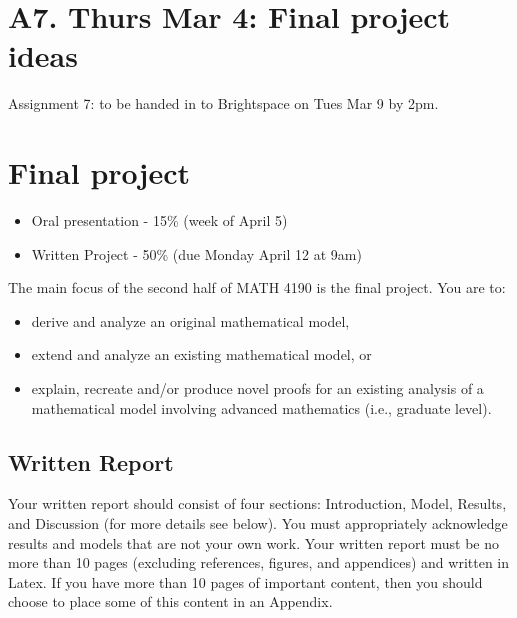 \documentclass[]{book}
\providecommand{\tightlist}{%
  \setlength{\itemsep}{0pt}\setlength{\parskip}{0pt}}
\begin{document}
\section{}\label{section}

\chapter{A7. Thurs Mar 4: Final project
ideas}\label{a7.-thurs-mar-4-final-project-ideas}

Assignment 7: to be handed in to Brightspace on Tues Mar 9 by 2pm.

\chapter{Final project}\label{final-project}

\begin{itemize}
\tightlist
\item
  Oral presentation - 15\% (week of April 5)
\item
  Written Project - 50\% (due Monday April 12 at 9am)
\end{itemize}

The main focus of the second half of MATH 4190 is the final project. You
are to:

\begin{itemize}
\tightlist
\item
  derive and analyze an original mathematical model,
\item
  extend and analyze an existing mathematical model, or
\item
  explain, recreate and/or produce novel proofs for an existing analysis
  of a mathematical model involving advanced mathematics (i.e., graduate
  level).
\end{itemize}

\section{Written Report}\label{written-report}

Your written report should consist of four sections: Introduction,
Model, Results, and Discussion (for more details see below). You must
appropriately acknowledge results and models that are not your own work.
Your written report must be no more than 10 pages (excluding references,
figures, and appendices) and written in Latex. If you have more than 10
pages of important content, then you should choose to place some of this
content in an Appendix.
\end{document}
